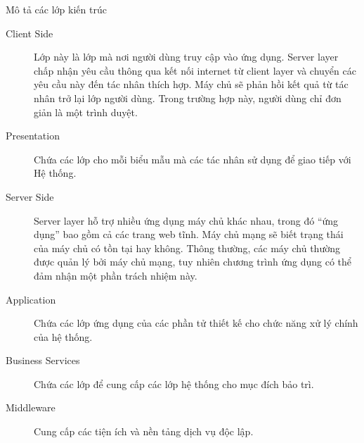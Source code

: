 \documentclass[./../main_file.tex]{subfiles}
\begin{document}
	
	Mô tả các lớp kiến trúc
	\begin{description}
		\item[Client Side] Lớp này là lớp mà nơi người dùng truy cập vào ứng dụng. Server layer chấp nhận yêu cầu thông qua kết nối internet từ client layer và chuyển các yêu cầu này đến tác nhân thích hợp. Máy chủ sẽ phản hồi kết quả từ tác nhân trở lại lớp người dùng. Trong trường hợp này, người dùng chỉ đơn giản là một trình duyệt.
		\item[Presentation] Chứa các lớp cho mỗi biểu mẫu mà các tác nhân sử dụng để giao tiếp với Hệ thống.
		\item[Server Side] Server layer hỗ trợ nhiều ứng dụng máy chủ khác nhau, trong đó “ứng dụng” bao gồm cả các trang web tĩnh. Máy chủ mạng sẽ biết trạng thái của máy chủ có tồn tại hay không. Thông thường, các máy chủ thường được quản lý bởi máy chủ mạng, tuy nhiên chương trình ứng dụng có thể đảm nhận một phần trách nhiệm này.
		\item[Application] Chứa các lớp ứng dụng của các phần tử thiết kế cho chức năng xử lý chính của hệ thống.
		\item[Business Services] Chứa các lớp để cung cấp các lớp hệ thống cho mục đích bảo trì.
		\item[Middleware] Cung cấp các tiện ích và nền tảng dịch vụ độc lập.
	\end{description}
	
	
	
\end{document}
